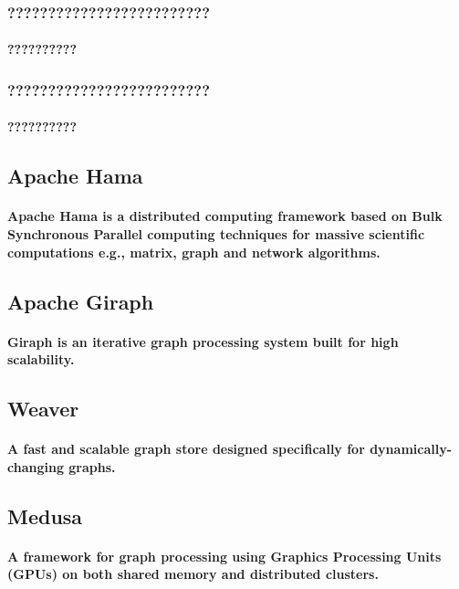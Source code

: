 \subsubsection{?????????????????????????}
\paragraph{??????????}
\subsubsection{?????????????????????????}
\paragraph{??????????}
\subsection{Apache Hama}
\paragraph{Apache Hama is a distributed computing framework based on Bulk Synchronous Parallel computing techniques for massive scientific computations e.g., matrix, graph and network algorithms.\cite{seo2010hama}}
\subsection{Apache Giraph}
\paragraph{Giraph is an iterative graph processing system built for high scalability.\cite{ching2013scaling}}
\subsection{Weaver}
\paragraph{A fast and scalable graph store designed specifically for dynamically-changing graphs.\cite{wu2012kernel}}
\subsection{Medusa}
\paragraph{A framework for graph processing using Graphics Processing Units (GPUs) on both shared memory and distributed clusters.\cite{zhong2014medusa}}
